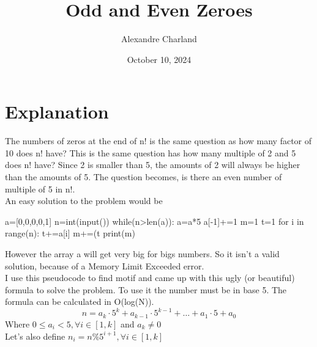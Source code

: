 \documentclass{article}
\title{Odd and Even Zeroes}
\author{Alexandre Charland}
\date{October 10, 2024}
\begin{document}
\maketitle

\section{Explanation}
The numbers of zeros at the end of n! is the same question as how many factor of 10 does n! have? This is the same question has how many multiple of 2 and 5 does n! have? Since 2 is smaller than 5, the amounts of 2 will always be higher than the amounts of 5. The question becomes, is there an even number of multiple of 5 in n!.\\
An easy solution to the problem would be
\begin{python}
a=[0,0,0,0,1]
n=int(input())
while(n>len(a)):
    a=a*5
    a[-1]+=1
m=1
t=1
for i in range(n):
    t+=a[i]
    m+=(t%
print(m)
\end{python}
However the array a will get very big for bigs numbers. So it isn't a valid solution, because of a Memory Limit Exceeded error.\\
I use this pseudocode to find motif and came up with this ugly (or beautiful) formula to solve the problem. To use it the number must be in base 5. The formula can be calculated in O(log(N)).\
\[ n=a_{k}\cdot 5^{k}+a_{k-1}\cdot 5^{k-1}+\ldots+a_{1}\cdot 5 +a_{0} \]
Where $0 \le a_{i} < 5, \forall i \in [1,k]$ and $a_{k} \neq 0$\\
Let's also define $n_i = n\% 5^{i+1}, \forall i \in [1,k]$
\end{document}
